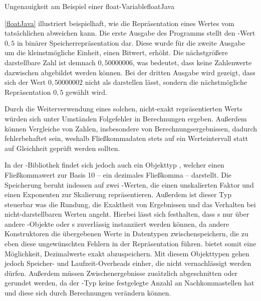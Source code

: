 \begin{codeWithCaption}{Ungenauigkeit am Beispiel einer float-Variable}{floatJava}
     \cFollow
\end{codeWithCaption}

\autoref{floatJava} illustriert beispielhaft, wie die Repräsentation eines Wertes vom tatsächlichen abweichen kann. Die erste Ausgabe des Programms stellt den -Wert $0,5$ in binärer Speicherrepräsentation dar. Diese wurde für die zweite Ausgabe um die kleinstmögliche Einheit, einen Bitwert, erhöht. Die nächstgrößere darstellbare Zahl ist demnach $0,50000006$, was bedeutet, dass keine Zahlenwerte dazwischen abgebildet werden können. Bei der dritten Ausgabe wird gezeigt, dass sich der Wert $0,50000002$ nicht als  darstellen lässt, sondern die nächstmögliche Repräsentation $0,5$ gewählt wird.

Durch die Weiterverwendung eines solchen, nicht-exakt repräsentierten Werts würden sich unter Umständen Folgefehler in Berechnungen ergeben. Außerdem können Vergleiche von Zahlen, insbesondere von Berechnungsergebnissen, dadurch fehlerbehaftet sein, weshalb Fließkommadaten stets auf ein Werteintervall statt auf Gleichheit geprüft werden sollten.

In der -Bibliothek findet sich jedoch auch ein Objekttyp , welcher einen Fließkommawert zur Basis 10 -- ein dezimales Fließkomma -- darstellt. Die Speicherung beruht in­des­sen auf zwei -Werten, die einen unskalierten Faktor und einen Exponenten zur Skalierung repräsentieren. Außerdem ist dieser Typ steuerbar was die Rundung, die Exaktheit von Ergebnissen und das Verhalten bei nicht-darstellbaren Werten angeht. Hierbei lässt sich festhalten, dass s nur über andere -Objekte oder s zuverlässig instanziiert werden können, da andere Konstruktoren die übergebenen Werte in Datentypen zwischenspeichern, die zu eben diese ungewünschten Fehlern in der Repräsentation führen.  bietet somit eine Möglichkeit, Dezimalwerte exakt abzuspeichern. Mit diesem Objekttypen gehen jedoch Speicher- und Laufzeit-Overheads einher, die nicht vernachlässigt werden dürfen. Außerdem müssen Zwischenergebnisse \idR zusätzlich abgeschnitten oder gerundet werden, da der -Typ keine festgelegte Anzahl an Nachkommastellen hat und diese sich durch Berechnungen verändern können.

